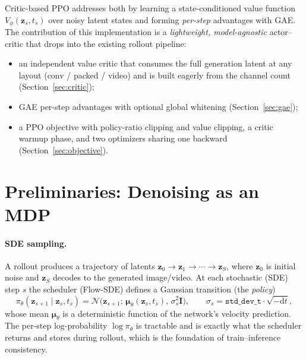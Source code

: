 \documentclass[11pt]{article}
\theoremstyle{plain}
\theoremstyle{remark}
\newcommand{\zt}{\bm{z}}
\begin{document}
Critic-based PPO addresses both by learning a state-conditioned value function
$V_\phi(\zt_s, t_s)$ over noisy latent states and forming \emph{per-step} advantages
with GAE. The contribution of this implementation is a \emph{lightweight,
model-agnostic} actor--critic that drops into the existing rollout pipeline:

\begin{itemize}[leftmargin=1.4em]
  \item an independent value critic that consumes the full generation latent at any
  layout (conv / packed / video) and is built eagerly from the channel count
  (Section~\ref{sec:critic});
  \item GAE per-step advantages with optional global whitening
  (Section~\ref{sec:gae});
  \item a PPO objective with policy-ratio clipping and value clipping, a critic
  warmup phase, and two optimizers sharing one backward
  (Section~\ref{sec:objective}).
\end{itemize}

\section{Preliminaries: Denoising as an MDP}
\label{sec:mdp}

\paragraph{SDE sampling.}
A rollout produces a trajectory of latents $\zt_0 \to \zt_1 \to \cdots \to \zt_S$,
where $\zt_0$ is initial noise and $\zt_S$ decodes to the generated image/video.
At each stochastic (SDE) step $s$ the scheduler (Flow-SDE) defines a Gaussian
transition (the \emph{policy})
\begin{equation}
\label{eq:policy}
\pi_\theta(\zt_{s+1}\mid \zt_s, t_s)
  = \mathcal{N}\!\big(\zt_{s+1};\, \bm{\mu}_\theta(\zt_s, t_s),\, \sigma_s^2 \bm{I}\big),
  \qquad \sigma_s = \texttt{std\_dev\_t}\cdot\sqrt{-\mathrm{d}t},
\end{equation}
whose mean $\bm{\mu}_\theta$ is a deterministic function of the network's velocity
prediction. The per-step log-probability $\log\pi_\theta$ is tractable and is exactly
what the scheduler returns and stores during rollout, which is the foundation of
train--inference consistency.
\end{document}
